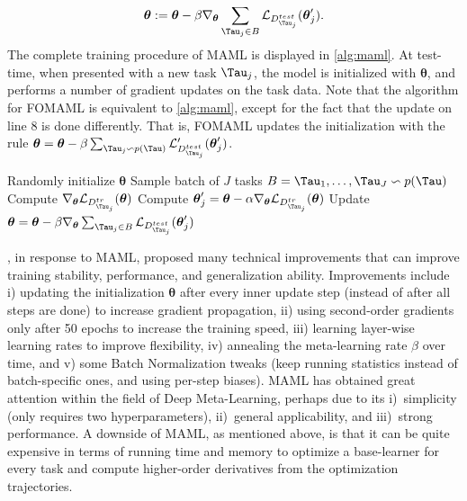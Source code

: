\begin{align}
    \boldsymbol{\theta} := \boldsymbol{\theta} - \beta \nabla_{\boldsymbol{\theta}} \sum_{\Tau_{j} \in B} \mathcal{L}_{D^{test}_{\Tau_{j}}}(\boldsymbol{\theta}_{j}').
\end{align} 
The complete training procedure of MAML is displayed in \autoref{alg:maml}. At test-time, when presented with a new task $\Tau_{j}$, the model is initialized with $\boldsymbol{\theta}$, and performs a number of gradient updates on the task data. Note that the algorithm for FOMAML is  equivalent to \autoref{alg:maml}, except for the fact that the update on line 8 is done differently. That is, FOMAML updates the initialization with the rule $\boldsymbol{\theta} = \boldsymbol{\theta} - \beta \sum_{\Tau_{j} \backsim p(\Tau)}  \mathcal{L}'_{D^{test}_{\Tau_{j}}}(\boldsymbol{\theta}_{j}')$.
\begin{algorithm}
\caption{One-step MAML for supervised learning, by }\label{alg:maml}
\begin{algorithmic}[1]
\State Randomly initialize $\boldsymbol{\theta}$
\State Sample batch of $J$ tasks $B = \Tau_{1},\ldots ,\Tau_{J} \backsim p(\Tau)$
\State Compute $\nabla_{\boldsymbol{\theta}} \mathcal{L}_{D^{tr}_{\Tau_{j}}}(\boldsymbol{\theta})$
\State Compute $\boldsymbol{\theta}_{j}' = \boldsymbol{\theta} - \alpha \nabla_{\boldsymbol{\theta}} \mathcal{L}_{D^{tr}_{\Tau_{j}}}(\boldsymbol{\theta})$
\EndFor
\State Update $\boldsymbol{\theta} = \boldsymbol{\theta} - \beta \nabla_{\boldsymbol{\theta}}\sum_{\Tau_{j} \in B} \mathcal{L}_{D^{test}_{\Tau_{j}}}(\boldsymbol{\theta}_{j}')$
\EndWhile
\end{algorithmic}
\end{algorithm} 
, in response to MAML, proposed many technical improvements that can improve training stability, performance, and generalization ability. Improvements include i) updating the initialization $\boldsymbol{\theta}$ after every inner update step (instead of after all steps are done) to increase gradient propagation, ii) using second-order gradients only after 50 epochs to increase the training speed, iii) learning layer-wise learning rates to improve flexibility, iv) annealing the meta-learning rate $\beta$ over time, and v) some Batch Normalization tweaks (keep running statistics instead of batch-specific ones, and using per-step biases). 
MAML has obtained great attention within the field of Deep Meta-Learning, perhaps due to its i)~simplicity (only requires two hyperparameters), ii)~general applicability, and iii)~strong performance. A downside of MAML, as mentioned above, is that it can be quite expensive in terms of running time and memory to optimize a base-learner for every task and compute higher-order derivatives from the optimization trajectories.

